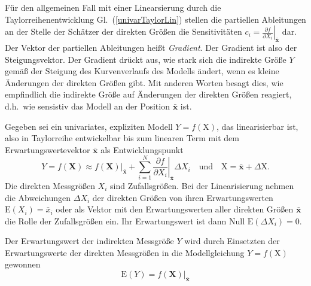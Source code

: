 Für den allgemeinen Fall mit einer Linearsierung durch die Taylorreihenentwicklung
Gl.~(\ref{univarTaylorLin}) stellen die partiellen Ableitungen an
der Stelle der Schätzer der direkten Größen die Sensitivitäten
$c_i = \left. \frac{\partial f}{\partial X_i} \right|_{\bar{\mathbf{x}}}$ dar. Der
Vektor der partiellen Ableitungen heißt \textsl{Gradient}. Der Gradient ist also
der Steigungsvektor.
Der Gradient drückt aus, wie stark sich die indirekte Größe $Y$ gemäß der Steigung
des Kurvenverlaufs des Modells
ändert, wenn es kleine Änderungen der direkten Größen gibt. Mit anderen Worten besagt dies, wie
empfindlich die indirekte Größe auf Änderungen der direkten Größen reagiert, d.h.\ wie sensistiv
das Modell an der Position $\bar{\mathbf{x}}$ ist.

Gegeben sei ein univariates, expliziten Modell $Y = f(\mathrm{X})$, das linearisierbar ist, also
in Taylorreihe entwickelbar bis zum linearen Term mit dem Erwartungswertevektor
$\bar{\mathbf{x}}$ als Entwicklungspunkt
\begin{equation}
Y = f(\mathbf{X}) \approx \left. f(\mathbf{X}) \right|_{\bar{\mathbf{x}}} +
\sum_{i=1}^N \left.
\frac{\partial f}{\partial X_i} \right|_{\bar{\mathbf{x}}} \Delta X_i
\quad \text{und} \quad \mathrm{X} = \bar{\mathbf{x}} + \Delta \mathrm{X} .
\label{linearisiertesModellY}
\end{equation}
Die direkten Messgrößen $X_i$ sind Zufallsgrößen.
Bei der Linearisierung nehmen die Abweichungen $\Delta X_i$ der direkten Größen von ihren Erwartungswerten
$\mathrm{E}(X_i) = \bar x_i$ oder als Vektor mit den Erwartungswerten aller direkten Größen
$\bar{\mathbf{x}}$ die Rolle der Zufallsgrößen ein. Ihr Erwartungswert ist dann
Null $\mathrm{E}(\Delta X_i) = 0$.

Der Erwartungswert der indirekten Messgröße $Y$ wird durch Einsetzten der Erwartungswerte der
direkten Messgrößen in die Modellgleichung $Y = f(\mathrm{X})$ gewonnen
\begin{equation}
\mathrm{E}(Y) = \left. f(\mathbf{X}) \right|_{\bar{\mathbf{x}}}
\end{equation}

